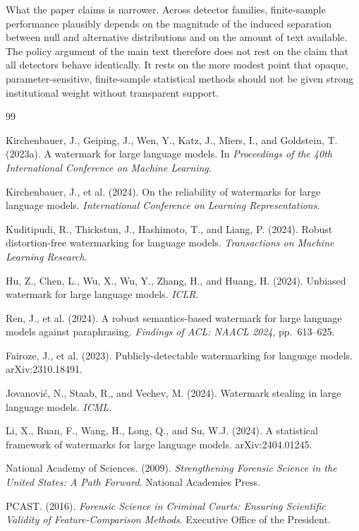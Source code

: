 \documentclass[11pt]{article}
\begin{document}
What the paper claims is narrower. Across detector families, finite-sample
performance plausibly depends on the magnitude of the induced separation between null
and alternative distributions and on the amount of text available. The policy
argument of the main text therefore does not rest on the claim that all detectors
behave identically. It rests on the more modest point that opaque,
parameter-sensitive, finite-sample statistical methods should not be given strong
institutional weight without transparent support.

\begin{thebibliography}{99}

 Kirchenbauer, J., Geiping, J., Wen, Y., Katz, J., Miers, I., and
Goldstein, T. (2023a). A watermark for large language models. In \emph{Proceedings
of the 40th International Conference on Machine Learning}.

 Kirchenbauer, J., et al. (2024). On the reliability of watermarks
for large language models. \emph{International Conference on Learning
Representations}.

 Kuditipudi, R., Thickstun, J., Hashimoto, T., and Liang, P. (2024).
Robust distortion-free watermarking for language models. \emph{Transactions on
Machine Learning Research}.

 Hu, Z., Chen, L., Wu, X., Wu, Y., Zhang, H., and Huang, H. (2024).
Unbiased watermark for large language models. \emph{ICLR}.

 Ren, J., et al. (2024). A robust semantics-based watermark for large
language models against paraphrasing. \emph{Findings of ACL: NAACL 2024}, pp.\
613--625.

 Fairoze, J., et al. (2023). Publicly-detectable watermarking for
language models. arXiv:2310.18491.

 Jovanovi\'c, N., Staab, R., and Vechev, M. (2024). Watermark stealing
in large language models. \emph{ICML}.

 Li, X., Ruan, F., Wang, H., Long, Q., and Su, W.J. (2024). A
statistical framework of watermarks for large language models. arXiv:2404.01245.

 National Academy of Sciences. (2009). \emph{Strengthening Forensic
Science in the United States: A Path Forward}. National Academies Press.

 PCAST. (2016). \emph{Forensic Science in Criminal Courts: Ensuring
Scientific Validity of Feature-Comparison Methods}. Executive Office of the
President.


\end{thebibliography}
\end{document}
